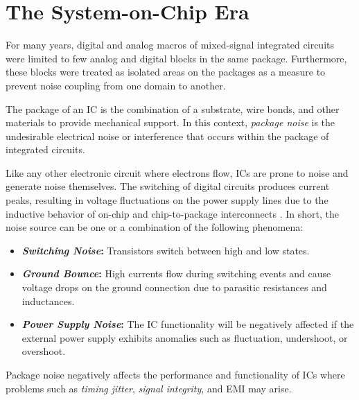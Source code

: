 
\section{The System-on-Chip Era}
\label{sec:soc-era}

For many years, digital and analog macros of mixed-signal integrated
circuits were limited to few analog and digital blocks
in the same package.
Furthermore, these blocks were treated as isolated areas on
the packages as a measure to prevent noise coupling from one domain to another.

The package of an \ac{IC} is the combination of a substrate, wire bonds,
and other materials to provide mechanical support.
In this context, \emph{package noise} is the undesirable electrical noise
or interference that occurs within the package of integrated circuits.

Like any other electronic circuit where electrons flow, \acp{IC} are prone to
noise and generate noise themselves.
The switching of digital circuits produces current peaks, resulting in
voltage fluctuations on the power supply lines due to the inductive behavior of
on-chip and chip-to-package interconnects \autocite{Popovich}.
In short, the noise source can be one or a combination of the following
phenomena:

\begin{itemize}[topsep=8pt,itemsep=4pt,partopsep=4pt, parsep=4pt]

    \item \textbf{\emph{Switching Noise}:} Transistors
    switch between high and low states.

    \item \textbf{\emph{Ground Bounce}:} High currents flow during
    switching events and cause voltage drops on the ground connection due to
    parasitic resistances and inductances.

    \item \textbf{\emph{Power Supply Noise}:} The \ac{IC} functionality will be
    negatively affected if the external power supply exhibits anomalies such
    as fluctuation, undershoot, or overshoot.

\end{itemize}

Package noise negatively affects the performance and functionality of \ac{IC}s
where problems such as \emph{timing jitter}, \emph{signal integrity},
and \ac{EMI} may arise.

